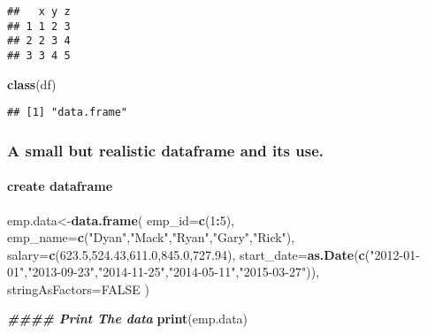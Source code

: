 \documentclass[
]{article}
\newenvironment{Shaded}{\begin{snugshade}}{\end{snugshade}}
\newcommand{\AttributeTok}[1]{\textcolor[rgb]{0.13,0.29,0.53}{#1}}
\newcommand{\ConstantTok}[1]{\textcolor[rgb]{0.56,0.35,0.01}{#1}}
\newcommand{\DecValTok}[1]{\textcolor[rgb]{0.00,0.00,0.81}{#1}}
\newcommand{\DocumentationTok}[1]{\textcolor[rgb]{0.56,0.35,0.01}{\textbf{\textit{#1}}}}
\newcommand{\FloatTok}[1]{\textcolor[rgb]{0.00,0.00,0.81}{#1}}
\newcommand{\FunctionTok}[1]{\textcolor[rgb]{0.13,0.29,0.53}{\textbf{#1}}}
\newcommand{\NormalTok}[1]{#1}
\newcommand{\OtherTok}[1]{\textcolor[rgb]{0.56,0.35,0.01}{#1}}
\newcommand{\SpecialCharTok}[1]{\textcolor[rgb]{0.81,0.36,0.00}{\textbf{#1}}}
\newcommand{\StringTok}[1]{\textcolor[rgb]{0.31,0.60,0.02}{#1}}
\begin{document}
\begin{verbatim}
##   x y z
## 1 1 2 3
## 2 2 3 4
## 3 3 4 5
\end{verbatim}

\begin{Shaded}
\begin{Highlighting}[]
\FunctionTok{class}\NormalTok{(df)}
\end{Highlighting}
\end{Shaded}

\begin{verbatim}
## [1] "data.frame"
\end{verbatim}

\subsubsection{A small but realistic dataframe and its
use.}\label{a-small-but-realistic-dataframe-and-its-use.}

\paragraph{create dataframe}\label{create-dataframe}

\begin{Shaded}
\begin{Highlighting}[]
\NormalTok{emp.data}\OtherTok{\textless{}{-}}\FunctionTok{data.frame}\NormalTok{(}
\AttributeTok{emp\_id=}\FunctionTok{c}\NormalTok{(}\DecValTok{1}\SpecialCharTok{:}\DecValTok{5}\NormalTok{),}
\AttributeTok{emp\_name=}\FunctionTok{c}\NormalTok{(}\StringTok{"Dyan"}\NormalTok{,}\StringTok{"Mack"}\NormalTok{,}\StringTok{"Ryan"}\NormalTok{,}\StringTok{"Gary"}\NormalTok{,}\StringTok{"Rick"}\NormalTok{),}
\AttributeTok{salary=}\FunctionTok{c}\NormalTok{(}\FloatTok{623.5}\NormalTok{,}\FloatTok{524.43}\NormalTok{,}\FloatTok{611.0}\NormalTok{,}\FloatTok{845.0}\NormalTok{,}\FloatTok{727.94}\NormalTok{),}
\AttributeTok{start\_date=}\FunctionTok{as.Date}\NormalTok{(}\FunctionTok{c}\NormalTok{(}\StringTok{"2012{-}01{-}01"}\NormalTok{,}\StringTok{"2013{-}09{-}23"}\NormalTok{,}\StringTok{"2014{-}11{-}25"}\NormalTok{,}\StringTok{"2014{-}05{-}11"}\NormalTok{,}\StringTok{"2015{-}03{-}27"}\NormalTok{)),}
\AttributeTok{stringAsFactors=}\ConstantTok{FALSE}
\NormalTok{)}


\DocumentationTok{\#\#\#\# Print The data}
\FunctionTok{print}\NormalTok{(emp.data)}
\end{Highlighting}
\end{Shaded}
\end{document}
